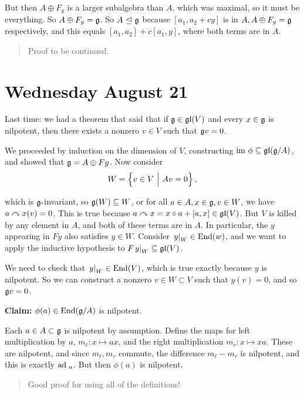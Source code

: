 But then \(A \oplus F_y\) is a larger subalgebra than \(A\), which was
maximal, so it must be everything. So \(A \oplus F_y = {\mathfrak{g}}\). So
\(A {~\trianglelefteq~} {\mathfrak{g}}\) because \([a_1, a_2 + cy]\) is in
\(A, A \oplus F_y = {\mathfrak{g}}\) respectively, and this equals
\([a_1, a_2] + c[a_1, y]\), where both terms are in \(A\).

\begin{quote}
Proof to be continued.
\end{quote}

\hypertarget{wednesday-august-21}{%
\section{Wednesday August 21}\label{wednesday-august-21}}

Last time: we had a theorem that said that if \({\mathfrak{g}} \in {\mathfrak{gl}}(V)\)
and every \(x\in{\mathfrak{g}}\) is nilpotent, then there exists a nonzero
\(v \in V\) such that \({\mathfrak{g}} v = 0\).

We proceeded by induction on the dimension of \(V\), constructing
\({\text{im}~} \phi \subseteq {\mathfrak{gl}}({\mathfrak{g}}/A)\), and showed that
\({\mathfrak{g}} = A \oplus Fy\). Now consider \[
W = \left\{{v\in V {~\mathrel{\Big|}~} Av = 0}\right\},
\]

which is \({\mathfrak{g}}{\hbox{-}}\)invariant, so \({\mathfrak{g}}(W) \subseteq W\), or for
all \(a\in A, x\in {\mathfrak{g}}, v\in W\), we have \(a\curvearrowright x(v) = 0\). This
is true because \(a\curvearrowright x = x\circ a + [a, x] \in {\mathfrak{gl}}(V)\). But
\(V\) is killed by any element in \(A\), and both of these terms are in
\(A\). In particular, the \(y\) appearing in \(Fy\) also satisfies
\(y \in W\). Consider \({\left.{y}\right|_{W}} \in \mathrm{End}(w)\), and
we want to apply the inductive hypothesis to
\(F {\left.{y}\right|_{W}} \subseteq {\mathfrak{gl}}(V)\).

We need to check that \({\left.{y}\right|_{W}} \in \mathrm{End}(V)\),
which is true exactly because \(y\) is nilpotent. So we can construct a
nonzero \(v\in W \subset V\) such that \(y(v) = 0\), and so
\({\mathfrak{g}} v = 0\).

\textbf{Claim:} \(\phi(a) \in \mathrm{End}({\mathfrak{g}}/A)\) is nilpotent.

Each \(a\in A\subset {\mathfrak{g}}\) is nilpotent by assumption. Define the maps
for left multiplication by \(a\), \(m_\ell: x \mapsto ax\), and the
right multiplication \(m_r: x \mapsto xa\). These are nilpotent, and
since \(m_\ell, m_r\) commute, the difference \(m_\ell - m_r\) is
nilpotent, and this is exactly \(\mathrm{ad}~_a\). But then \(\phi(a)\) is
nilpotent.

\begin{quote}
Good proof for using all of the definitions!
\end{quote}

